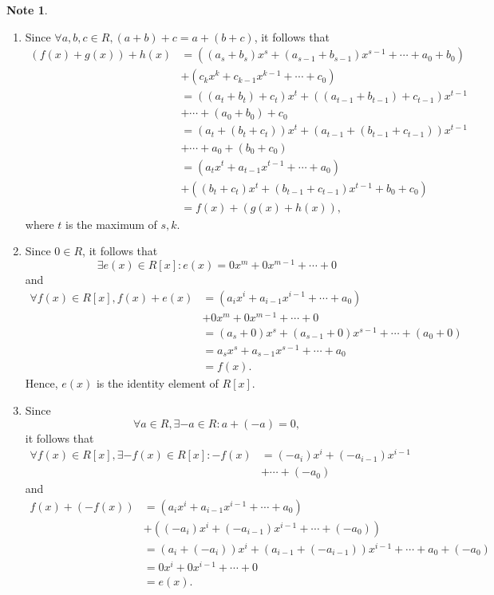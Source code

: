 \documentclass{article}
\theoremstyle{definition}
\newtheorem{note}{Note}[section]
\begin{document}
\begin{note}
\begin{enumerate}
        \item Since $\forall a,b,c \in R, (a+b)+c=a+(b+c)$, it follows that
        \begin{align*}
            (f(x)+g(x))+h(x)&=((a_s+b_s)x^s+(a_{s-1}+b_{s-1})x^{s-1}+\cdots+a_0+b_0) \\
            &+ (c_kx^k+c_{k-1}x^{k-1}+\cdots+c_0) \\
            &= ((a_t+b_t)+c_t)x^t+((a_{t-1}+b_{t-1})+c_{t-1})x^{t-1} \\
            &+\cdots+(a_0+b_0)+c_0 \\
            &= (a_t+(b_t+c_t))x^t+(a_{t-1}+(b_{t-1}+c_{t-1}))x^{t-1} \\
            &+\cdots+a_0+(b_0+c_0) \\
            &=(a_tx^t+a_{t-1}x^{t-1}+\cdots+a_0) \\
            &+((b_t+c_t)x^t+(b_{t-1}+c_{t-1})x^{t-1}+b_0+c_0) \\
            &=f(x)+(g(x)+h(x)),
        \end{align*}
        where $t$ is the maximum of $s,k$.
        
        \item Since $0\in R$, it follows that 
        \begin{equation*}
            \exists e(x)\in R[x]: e(x)=0x^m+0x^{m-1}+\cdots+0
        \end{equation*}
        and
        \begin{align*}
            \forall f(x)\in R[x], f(x)+e(x) &= (a_ix^i+a_{i-1}x^{i-1}+\cdots+a_0) \\
            &+ 0x^m+0x^{m-1}+\cdots+0 \\
            &=(a_s+0)x^s+(a_{s-1}+0)x^{s-1}+\cdots+(a_0+0) \\
            &=a_sx^s+a_{s-1}x^{s-1}+\cdots+a_0 \\
            &=f(x).
        \end{align*}
        Hence, $e(x)$ is the identity element of $R[x]$.
        
        \item Since 
        \begin{equation*}
            \forall a\in R, \exists -a\in R: a+(-a)=0,
        \end{equation*}
        it follows that
        \begin{align*}
            \forall f(x)\in R[x], \exists -f(x)\in R[x]: -f(x)&=(-a_i)x^i+(-a_{i-1})x^{i-1} \\
            &+\cdots+(-a_0)
        \end{align*}
        and
        \begin{align*}
            f(x)+(-f(x))&=(a_ix^i+a_{i-1}x^{i-1}+\cdots+a_0) \\
            &+ ((-a_i)x^i+(-a_{i-1})x^{i-1}+\cdots+(-a_0)) \\
            &= (a_i+(-a_i))x^i+(a_{i-1}+(-a_{i-1}))x^{i-1}+\cdots+a_0+(-a_0) \\
            &=0x^i+0x^{i-1}+\cdots+0\\
            &=e(x).
        \end{align*}
        

\end{enumerate}
\end{note}
\end{document}
